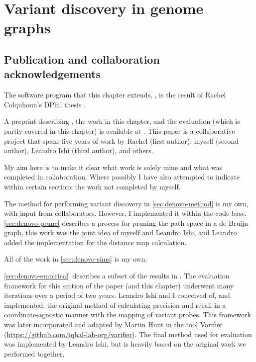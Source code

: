 
\chapter{Variant discovery in genome graphs}
\label{chap:denovo}
\ifpdf
    \graphicspath{{Chapter1/Figs/Raster/}{Chapter1/Figs/PDF/}{Chapter1/Figs/}}
\else
    \graphicspath{{Chapter1/Figs/Vector/}{Chapter1/Figs/}}
\fi
\setcounter{section}{-1}
\section{Publication and collaboration acknowledgements}
\label{sec:denovo-acknowledge}

The software program that this chapter extends, \pandora{}, is the result of Rachel Colquhoun's DPhil thesis \cite{rachelthesis}.

A preprint describing \pandora{}, the work in this chapter, and the evaluation (which is partly covered in this chapter) is available at \cite{pandora}. This paper is a collaborative project that spans five years of work by Rachel (first author), myself (second author), Leandro Ishi (third author), and others.

My aim here is to make it clear what work is solely mine and what was completed in collaboration. Where possibly I have also attempted to indicate within certain sections the work not completed by myself.

The method for performing \denovo{} variant discovery in \autoref{sec:denovo-method} is my own, with input from collaborators. However, I implemented it within the \pandora{} code base. \autoref{sec:denovo-prune} describes a process for pruning the path-space in a de Bruijn graph, this work was the joint idea of myself and Leandro Ishi, and Leandro added the implementation for the distance map calculation.

All of the work in \autoref{sec:denovo-sims} is my own.

\autoref{sec:denovo-empirical} describes a subset of the results in \cite{pandora}. The evaluation framework for this section of the paper (and this chapter) underwent many iterations over a period of two years. Leandro Ishi and I conceived of, and implemented, the original method of calculating precision and recall in a coordinate-agnostic manner with the mapping of variant probes. This framework was later incorporated and adapted by Martin Hunt in the tool Varifier (\url{https://github.com/iqbal-lab-org/varifier}). The final method used for evaluation was implemented by Leandro Ishi, but is heavily based on the original work we performed together.

